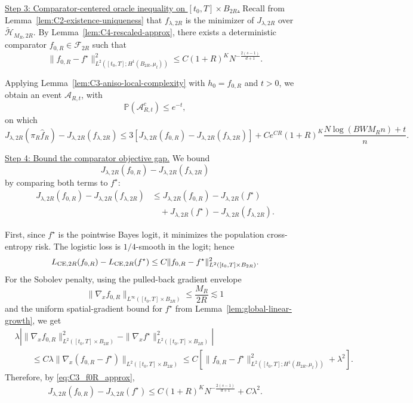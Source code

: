 \documentclass[11pt]{article}
\theoremstyle{plain}
\theoremstyle{definition}
\theoremstyle{remark}
\newcommand{\proofstep}[1]{\par\medskip\noindent\uline{#1}}
\begin{document}
\proofstep{Step 3: Comparator-centered oracle inequality on \([t_0,T]\times B_{2R}\).}
Recall from Lemma~\ref{lem:C2-existence-uniqueness} that
\(f_{\lambda,2R}\) is the minimizer of \(J_{\lambda,2R}\) over
\(\widetilde{\mathcal H}_{M_R,2R}\).
By Lemma~\ref{lem:C4-rescaled-approx}, there exists a deterministic
comparator
$
f_{0,R}\in\mathcal F_{2R}
$
such that
\begin{equation}
\label{eq:C3_f0R_approx}
\|f_{0,R}-f^\star\|_{L^2([t_0,T];H^1(B_{2R},\mu_t))}^2
\le
C(1+R)^K N^{-\frac{2(s-1)}{d+1}}.
\end{equation}

Applying Lemma~\ref{lem:C3-aniso-local-complexity} with
\(h_0=f_{0,R}\) and \(t>0\), we obtain an event
\(\mathcal A_{R,t}\), with
\[
\mathbb P(\mathcal A_{R,t}^c)\le e^{-t},
\]
on which
\begin{equation}
\label{eq:C3_oracle_gap_new}
J_{\lambda,2R}(\pi_R\widehat f_R)
-
J_{\lambda,2R}(f_{\lambda,2R})
\le
3\left[
J_{\lambda,2R}(f_{0,R})
-
J_{\lambda,2R}(f_{\lambda,2R})
\right]
+
C e^{CR}(1+R)^K
\frac{N\log(BWM_Rn)+t}{n}.
\end{equation}


\proofstep{Step 4: Bound the comparator objective gap.}
We bound
\[
J_{\lambda,2R}(f_{0,R})
-
J_{\lambda,2R}(f_{\lambda,2R})
\]
by comparing both terms to \(f^\star\):
\[
\begin{aligned}
J_{\lambda,2R}(f_{0,R})
-
J_{\lambda,2R}(f_{\lambda,2R})
&\le
J_{\lambda,2R}(f_{0,R})-J_{\lambda,2R}(f^\star)\\
&\quad+
J_{\lambda,2R}(f^\star)-J_{\lambda,2R}(f_{\lambda,2R}).
\end{aligned}
\]

First, since \(f^\star\) is the pointwise Bayes logit, it minimizes the
population cross-entropy risk. The logistic loss is \(1/4\)-smooth in the
logit; hence
\[
L_{{\rm CE},2R}(f_{0,R})-L_{{\rm CE},2R}(f^\star)
\le
C\|f_{0,R}-f^\star\|_{L^2([t_0,T]\times B_{2R})}^2.
\]
For the Sobolev penalty, using the pulled-back gradient envelope
\[
\|\nabla_x f_{0,R}\|_{L^\infty([t_0,T]\times B_{2R})}
\le \frac{M_R}{2R}\lesssim 1
\]
and the uniform spatial-gradient bound for \(f^\star\) from
Lemma~\ref{lem:global-linear-growth}, we get
\[
\begin{aligned}
&\lambda
\left|
\|\nabla_x f_{0,R}\|_{L^2([t_0,T]\times B_{2R})}^2
-
\|\nabla_x f^\star\|_{L^2([t_0,T]\times B_{2R})}^2
\right|\\
&\qquad\le
C\lambda
\|\nabla_x(f_{0,R}-f^\star)\|_{L^2([t_0,T]\times B_{2R})}
\le
C\left[
\|f_{0,R}-f^\star\|_{L^2([t_0,T];H^1(B_{2R},\mu_t))}^2+\lambda^2
\right].
\end{aligned}
\]
Therefore, by \eqref{eq:C3_f0R_approx},
\begin{equation}
\label{eq:C3_J_f0_fstar}
J_{\lambda,2R}(f_{0,R})-J_{\lambda,2R}(f^\star)
\le
C(1+R)^KN^{-\frac{2(s-1)}{d+1}}
+
C\lambda^2.
\end{equation}
\end{document}
